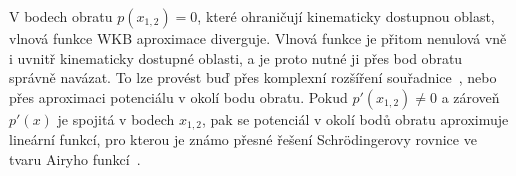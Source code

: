 V bodech obratu $p(x_{1,2})=0$, které ohraničují kinematicky dostupnou oblast, vlnová funkce WKB aproximace diverguje.
Vlnová funkce je přitom nenulová vně i uvnitř kinematicky dostupné oblasti, a je proto nutné ji přes bod obratu správně navázat.
To lze provést buď přes komplexní rozšíření souřadnice~\cite{Cejnar2013}, nebo přes aproximaci potenciálu v okolí bodu obratu. 
Pokud $p'(x_{1,2})\neq0$ a zároveň $p'(x)$ je spojitá v bodech $x_{1,2}$, pak se potenciál v okolí bodů obratu aproximuje lineární funkcí, pro kterou je známo přesné řešení Schrödingerovy rovnice ve tvaru Airyho funkcí~\cite{Formanek2004}.

\begin{figure}[!htbp]
    \begin{subfigure}{0.45\linewidth}
        \centering{}
    \end{subfigure}
    \hfill
    \begin{subfigure}{0.45\linewidth}
        \centering{}	
    \end{subfigure}
\label{fig:WKBConnection}
\end{figure}				

